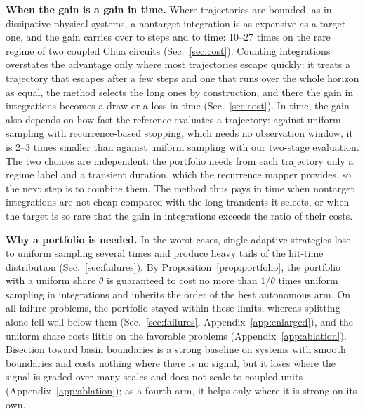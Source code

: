 \textbf{When the gain is a gain in time.} Where trajectories are bounded, as in dissipative physical systems, a nontarget integration is as expensive as a target one, and the gain carries over to steps and to time: 10--27 times on the rare regime of two coupled Chua circuits (Sec.~\ref{sec:cost}). Counting integrations overstates the advantage only where most trajectories escape quickly: it treats a trajectory that escapes after a few steps and one that runs over the whole horizon as equal, the method selects the long ones by construction, and there the gain in integrations becomes a draw or a loss in time (Sec.~\ref{sec:cost}). In time, the gain also depends on how fast the reference evaluates a trajectory: against uniform sampling with recurrence-based stopping, which needs no observation window, it is 2--3 times smaller than against uniform sampling with our two-stage evaluation. The two choices are independent: the portfolio needs from each trajectory only a regime label and a transient duration, which the recurrence mapper provides, so the next step is to combine them. The method thus pays in time when nontarget integrations are not cheap compared with the long transients it selects, or when the target is so rare that the gain in integrations exceeds the ratio of their costs.

\textbf{Why a portfolio is needed.} In the worst cases, single adaptive strategies lose to uniform sampling several times and produce heavy tails of the hit-time distribution (Sec.~\ref{sec:failures}). By Proposition~\ref{prop:portfolio}, the portfolio with a uniform share $\theta$ is guaranteed to cost no more than $1/\theta$ times uniform sampling in integrations and inherits the order of the best autonomous arm. On all failure problems, the portfolio stayed within these limits, whereas splitting alone fell well below them (Sec.~\ref{sec:failures}, Appendix~\ref{app:enlarged}), and the uniform share costs little on the favorable problems (Appendix~\ref{app:ablation}). Bisection toward basin boundaries\cite{NusseYorke1989,Skufca2006Edge} is a strong baseline on systems with smooth boundaries and costs nothing where there is no signal, but it loses where the signal is graded over many scales and does not scale to coupled units (Appendix~\ref{app:ablation}); as a fourth arm, it helps only where it is strong on its own.


